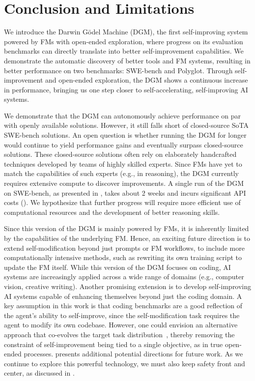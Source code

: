 \documentclass{article}
\begin{document}
\section{Conclusion and Limitations}
\label{sec:conclusion}


We introduce the Darwin G\"odel Machine (DGM), the first self-improving system powered by FMs with open-ended exploration, where progress on its evaluation benchmarks can directly translate into better self-improvement capabilities. We demonstrate the automatic discovery of better tools and FM systems, resulting in better performance on two benchmarks: SWE-bench and Polyglot. Through self-improvement and open-ended exploration, the DGM shows a continuous increase in performance, bringing us one step closer to self-accelerating, self-improving AI systems.

We demonstrate that the DGM can autonomously achieve performance on par with openly available solutions. However, it still falls short of closed-source SoTA SWE-bench solutions. An open question is whether running the DGM for longer would continue to yield performance gains and eventually surpass closed-source solutions. These closed-source solutions often rely on elaborately handcrafted techniques developed by teams of highly skilled experts. Since FMs have yet to match the capabilities of such experts (e.g., in reasoning), the DGM currently requires extensive compute to discover improvements. A single run of the DGM on SWE-bench, as presented in , takes about 2 weeks and incurs significant API costs (). We hypothesize that further progress will require more efficient use of computational resources and the development of better reasoning skills.

Since this version of the DGM is mainly powered by FMs, it is inherently limited by the capabilities of the underlying FM. Hence, an exciting future direction is to extend self-modification beyond just prompts or FM workflows, to include more computationally intensive methods, such as rewriting its own training script to update the FM itself. While this version of the DGM focuses on coding, AI systems are increasingly applied across a wide range of domains (e.g., computer vision, creative writing). Another promising extension is to develop self-improving AI systems capable of enhancing themselves beyond just the coding domain. A key assumption in this work is that coding benchmarks are a good reflection of the agent's ability to self-improve, since the self-modification task requires the agent to modify its own codebase. However, one could envision an alternative approach that co-evolves the target task distribution~\citep{faldor2025omni, wang2023robogen}, thereby removing the constraint of self-improvement being tied to a single objective, as in true open-ended processes.  presents additional potential directions for future work. As we continue to explore this powerful technology, we must also keep safety front and center, as discussed in .
\end{document}
